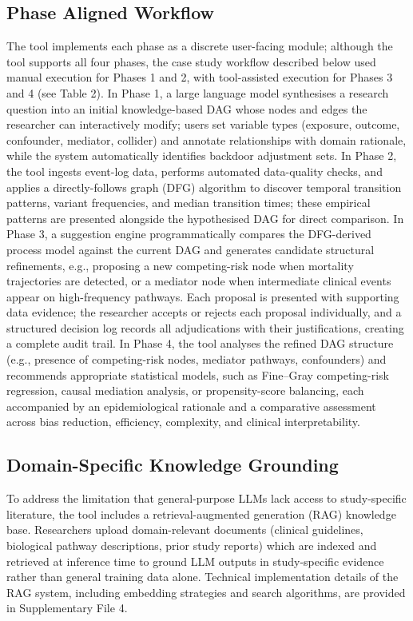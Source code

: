 \documentclass[sn-vancouver-num]{sn-jnl}
\begin{document}
\subsection{Phase Aligned Workflow}
The tool implements each phase as a discrete user-facing module; although the tool supports all four phases, the case study workflow described below used manual execution for Phases 1 and 2, with tool-assisted execution for Phases 3 and 4 (see Table 2). In Phase 1, a large language model synthesises a research question into an initial knowledge-based DAG whose nodes and edges the researcher can interactively modify; users set variable types (exposure, outcome, confounder, mediator, collider) and annotate relationships with domain rationale, while the system automatically identifies backdoor adjustment sets. In Phase 2, the tool ingests event-log data, performs automated data-quality checks, and applies a directly-follows graph (DFG) algorithm to discover temporal transition patterns, variant frequencies, and median transition times; these empirical patterns are presented alongside the hypothesised DAG for direct comparison. In Phase 3, a suggestion engine programmatically compares the DFG-derived process model against the current DAG and generates candidate structural refinements, e.g., proposing a new competing-risk node when mortality trajectories are detected, or a mediator node when intermediate clinical events appear on high-frequency pathways. Each proposal is presented with supporting data evidence; the researcher accepts or rejects each proposal individually, and a structured decision log records all adjudications with their justifications, creating a complete audit trail. In Phase 4, the tool analyses the refined DAG structure (e.g., presence of competing-risk nodes, mediator pathways, confounders) and recommends appropriate statistical models, such as Fine--Gray competing-risk regression, causal mediation analysis, or propensity-score balancing, each accompanied by an epidemiological rationale and a comparative assessment across bias reduction, efficiency, complexity, and clinical interpretability.

\subsection{Domain-Specific Knowledge Grounding}

To address the limitation that general-purpose LLMs lack access to study-specific literature, the tool includes a retrieval-augmented generation (RAG) knowledge base. Researchers upload domain-relevant documents (clinical guidelines, biological pathway descriptions, prior study reports) which are indexed and retrieved at inference time to ground LLM outputs in study-specific evidence rather than general training data alone. Technical implementation details of the RAG system, including embedding strategies and search algorithms, are provided in Supplementary File 4.
\end{document}
